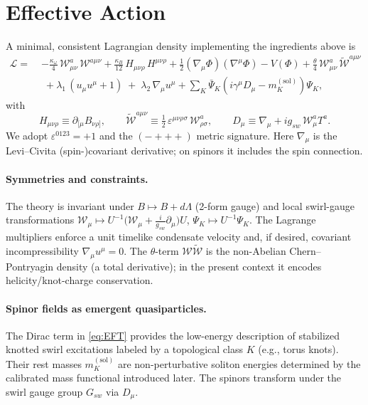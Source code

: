 \section{Effective Action}

A minimal, consistent Lagrangian density implementing the ingredients above is
\begin{align}
 \mathcal{L}
 =\;& -\frac{\kappa_\omega}{4}\,\mathcal{W}^a_{\mu\nu}\,\mathcal{W}^{a\mu\nu}
 +\frac{\kappa_B}{12}\,H_{\mu\nu\rho}\,H^{\mu\nu\rho}
 +\frac{1}{2}(\nabla_\mu\Phi)(\nabla^\mu\Phi)-V(\Phi)
 +\frac{\theta}{4}\,\mathcal{W}^a_{\mu\nu}\,\tilde{\mathcal{W}}^{a\mu\nu} \nonumber\\
 &\;+\lambda_1\,(u_\mu u^\mu+1)\;+\;\lambda_2\,\nabla_\mu u^\mu
 +\sum_K \bar\Psi_K\!\left(i\gamma^\mu D_\mu - m_K^{(\mathrm{sol})}\right)\!\Psi_K ,
    \label{eq:EFT}
\end{align}
with
\[
    H_{\mu\nu\rho}\equiv \partial_{[\mu}B_{\nu\rho]},\qquad
    \tilde{\mathcal{W}}^{a\mu\nu}\equiv \tfrac{1}{2}\,\varepsilon^{\mu\nu\rho\sigma}\,\mathcal{W}^a_{\rho\sigma},\qquad
    D_\mu\equiv \nabla_\mu + i g_{\!sw}\,\mathcal{W}_\mu^a T^a .
\]
We adopt \(\varepsilon^{0123}=+1\) and the \((-+++)\) metric signature.
Here \(\nabla_\mu\) is the Levi–Civita (spin-)covariant derivative; on spinors it includes the spin connection.

\paragraph{Symmetries and constraints.}
The theory is invariant under
\(B\mapsto B+d\Lambda\) (2-form gauge) and local swirl-gauge transformations
\(\mathcal{W}_\mu \mapsto U^{-1}\!\big(\mathcal{W}_\mu + \tfrac{i}{g_{\!sw}}\partial_\mu\big)U\),
\(\Psi_K\mapsto U^{-1}\Psi_K\).
The Lagrange multipliers enforce a unit timelike condensate velocity and, if desired, covariant incompressibility \(\nabla_\mu u^\mu=0\).
The \(\theta\)-term \(\mathcal{W}\tilde{\mathcal{W}}\) is the non-Abelian Chern–Pontryagin density (a total derivative); in the present context it encodes helicity/knot-charge conservation.

\paragraph{Spinor fields as emergent quasiparticles.}
The Dirac term in \eqref{eq:EFT} provides the low-energy description of stabilized knotted swirl excitations labeled by a topological class \(K\) (e.g., torus knots). Their rest masses \(m_K^{(\mathrm{sol})}\) are non-perturbative soliton energies determined by the calibrated mass functional introduced later. The spinors transform under the swirl gauge group \(G_{\!sw}\) via \(D_\mu\).

